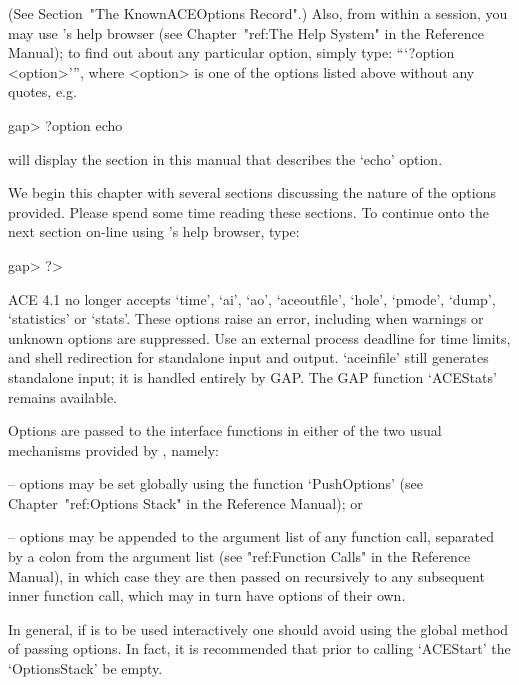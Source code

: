 (See Section~"The KnownACEOptions Record".) Also, from within a {\GAP}
session, you may use {\GAP}'s help browser (see Chapter~"ref:The  Help
System" in the  {\GAP}  Reference  Manual);  to  find  out  about  any
particular {\ACE} option, simply type: ```?option  <option>''',  where
<option> is one of the options listed above without any quotes, e.g.

\begintt
gap> ?option echo
\endtt

will display the section in this  manual  that  describes  the  `echo'
option.

We begin this chapter with several sections discussing the  nature  of
the options provided. Please spend some time reading  these  sections.
To continue onto the next section on-line using {\GAP}'s help browser,
type:

\begintt
gap> ?>
\endtt

ACE 4.1 no longer accepts `time', `ai', `ao', `aceoutfile', `hole',
`pmode', `dump', `statistics' or `stats'. These options raise an error,
including when warnings or unknown options are suppressed. Use an external
process deadline for time limits, and shell redirection for standalone
input and output. `aceinfile' still generates standalone input; it is
handled entirely by GAP. The GAP function `ACEStats' remains available.


Options are passed to the {\ACE} interface functions in either of the
two usual mechanisms provided by {\GAP}, namely:

\beginlist%

\item{--} options may be set globally using the function `PushOptions'
(see Chapter~"ref:Options Stack" in the {\GAP} Reference  Manual); or

\item{--} options may be appended to the argument list of any function
call, separated by a colon from the argument list  (see  "ref:Function
Calls" in the {\GAP} Reference Manual), in which case  they  are  then
passed on recursively to any subsequent inner function call, which may
in turn have options of their own.

\endlist

In general, if {\ACE} is to be used  interactively  one  should  avoid
using the global method of passing options. In fact, it is recommended
that prior to calling `ACEStart' the `OptionsStack' be empty.

